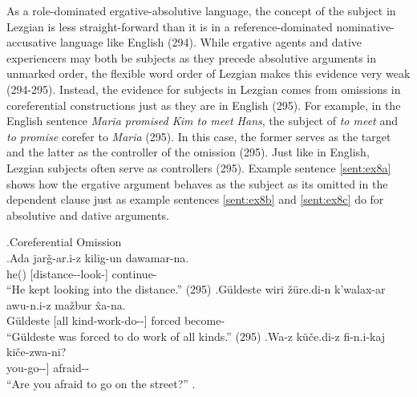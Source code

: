 As a role-dominated ergative-absolutive language, the concept of the subject in Lezgian is less straight-forward than it is in a reference-dominated nominative-accusative language like English (294). While ergative agents and dative experiencers may both be subjects as they precede absolutive arguments in unmarked order, the flexible word order of Lezgian makes this evidence very weak (294-295). Instead, the evidence for subjects in Lezgian comes from omissions in coreferential constructions just as they are in English (295). For example, in the English sentence \textit{Maria promised Kim to meet Hans}, the subject of \textit{to meet} and \textit{to promise} corefer to \textit{Maria} (295). In this case, the former serves as the target and the latter as the controller of the omission (295). Just like in English, Lezgian subjects often serve as controllers (295). Example sentence \ref{sent:ex8a} shows how the ergative argument behaves as the subject as its omitted in the dependent clause just as example sentences \ref{sent:ex8b} and \ref{sent:ex8c} do for absolutive and dative arguments.

\ex.\label{sent:ex8}Coreferential Omission \\
    \ag.\label{sent:ex8a}Ada jar\v{g}-ar.i-z kilig-un dawamar-na. \\
    he(\Erg[]) [distance-\Pl[]-\Dat[] look-\Masd[]] continue-\Aori[] \\
    ``He kept looking into the distance.'' (295)
    \bg.\label{sent:ex8b}G\"{u}ldeste wiri \v{z}\"{u}re.di-n k'walax-ar awu-n.i-z ma\v{z}bur \^{x}a-na. \\
    G\"{u}ldeste [all kind-\Gen[] work-\Pl[] do-\Masd[]-\Dat[]] forced become-\Aori[] \\
    ``G\"{u}ldeste was forced to do work of all kinds.'' (295)
    \cg.\label{sent:ex8c}Wa-z k\"{u}\v{c}e.di-z fi-n.i-kaj ki\v{c}e-zwa-ni? \\
    you-\Dat[] [street-\Dat[] go-\Masd[]-\Sbelc[]] afraid-\Impf[]-\Q[] \\
    ``Are you afraid to go on the street?''
    \z.

